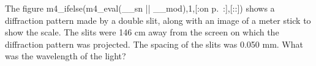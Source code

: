The figure 
m4_ifelse(m4_eval(__sn || __mod),1,[:on p.~\pageref{fig:hw-with-ruler}:],[::]) shows a diffraction pattern made by a double
slit, along with an image of a meter stick to show the
scale. The slits were 146 cm away from the screen on which
the diffraction pattern was projected. The spacing of the
slits was 0.050 mm. What was the wavelength of the light?\answercheck
